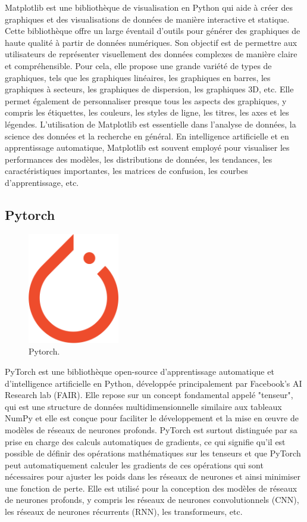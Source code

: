 Matplotlib est une bibliothèque de visualisation en Python qui aide à créer des graphiques et des visualisations de données de manière interactive et statique. Cette bibliothèque offre un large éventail d'outils pour générer des graphiques de haute qualité à partir de données numériques. Son objectif est de permettre aux utilisateurs de représenter visuellement des données complexes de manière claire et compréhensible. Pour cela, elle propose une grande variété de types de graphiques, tels que les graphiques linéaires, les graphiques en barres, les graphiques à secteurs, les graphiques de dispersion, les graphiques 3D, etc. Elle permet également de personnaliser presque tous les aspects des graphiques, y compris les étiquettes, les couleurs, les styles de ligne, les titres, les axes et les légendes. L'utilisation de Matplotlib est essentielle dans l'analyse de données, la science des données et la recherche en général. En intelligence artificielle et en apprentissage automatique, Matplotlib est souvent employé pour visualiser les performances des modèles, les distributions de données, les tendances, les caractéristiques importantes, les matrices de confusion, les courbes d'apprentissage, etc.

\subsection{Pytorch}

\begin{figure}[hbt!]
  \centering
  \includegraphics[width=4cm]{images_pfe/pytorch.png}
  \caption{Pytorch.}
  \label{fig:pytorch}
\end{figure}
\FloatBarrier
\medskip

PyTorch est une bibliothèque open-source d'apprentissage automatique et d'intelligence artificielle en Python, développée principalement par Facebook's AI Research lab (FAIR). Elle repose sur un concept fondamental appelé "tenseur", qui est une structure de données multidimensionnelle similaire aux tableaux NumPy et elle est conçue pour faciliter le développement et la mise en œuvre de modèles de réseaux de neurones profonds. PyTorch est surtout distinguée par sa prise en charge des calculs automatiques de gradients, ce qui signifie qu'il est possible de définir des opérations mathématiques sur les tenseurs et que PyTorch peut automatiquement calculer les gradients de ces opérations qui sont nécessaires pour ajuster les poids dans les réseaux de neurones et ainsi minimiser une fonction de perte. Elle est utilisé pour la conception des modèles de réseaux de neurones profonds, y compris les réseaux de neurones convolutionnels (CNN), les réseaux de neurones récurrents (RNN), les transformeurs, etc.

